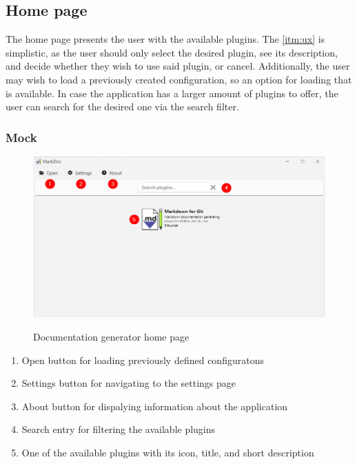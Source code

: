 \subsection{Home page}

The home page presents the user with the available plugins. The \ref{itm:ux} is simplistic, as the user should only select the desired plugin, see its description, and decide whether they wish to use said plugin, or cancel. Additionally, the user may wish to load a previously created configuration, so an option for loading that is available.
In case the application has a larger amount of plugins to offer, the user can search for the desired one via the search filter.

\subsubsection{Mock}

\begin{figure}[H]
    \caption{Documentation generator home page}
    \includegraphics[width=\linewidth]{img/markDocHomePage.png}
    \label{fig:homePage}
\end{figure}

\begin{enumerate}
    \item Open button for loading previously defined configuratons
    \item Settings button for navigating to the settings page
    \item About button for dispalying information about the application
    \item Search entry for filtering the available plugins
    \item One of the available plugins with its icon, title, and short description
\end{enumerate}


